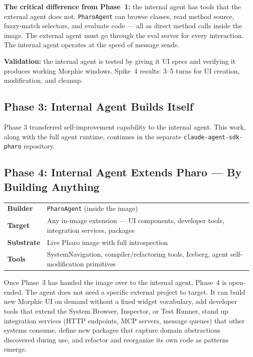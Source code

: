 \documentclass[a4paper,10pt,fleqn]{article}
\newcommand{\cls}[1]{\texttt{#1}}
\begin{document}
\textbf{The critical difference from Phase~1:} the internal agent has
tools that the external agent does not.  \cls{PharoAgent} can browse
classes, read method source, fuzzy-match selectors, and evaluate code
--- all as direct method calls inside the image.  The external agent
must go through the eval server for every interaction.  The internal
agent operates at the speed of message sends.

\textbf{Validation:} the internal agent is tested by giving it UI
specs and verifying it produces working Morphic windows.  Spike~4
results: 3--5 turns for UI creation, modification, and cleanup.

\subsection{Phase 3: Internal Agent Builds Itself}

Phase 3 transferred self-improvement capability to the internal agent.
This work, along with the full agent runtime, continues in the separate
\texttt{claude-agent-sdk-pharo} repository.

\subsection{Phase 4: Internal Agent Extends Pharo --- By Building Anything}

\begin{center}
\begin{tabularx}{\linewidth}{@{}lY@{}}
\toprule
\textbf{Builder} & \cls{PharoAgent} (inside the image) \\
\textbf{Target} & Any in-image extension --- UI components, developer
  tools, integration services, packages \\
\textbf{Substrate} & Live Pharo image with full introspection \\
\textbf{Tools} & SystemNavigation, compiler/refactoring tools, Iceberg,
  agent self-modification primitives \\
\bottomrule
\end{tabularx}
\end{center}

Once Phase~3 has handed the image over to the internal agent, Phase~4
is open-ended.  The agent does not need a specific external project to
target.  It can build new Morphic UI on demand without a fixed widget
vocabulary, add developer tools that extend the System Browser,
Inspector, or Test Runner, stand up integration services (HTTP
endpoints, MCP servers, message queues) that other systems consume,
define new packages that capture domain abstractions discovered during
use, and refactor and reorganize its own code as patterns emerge.
\end{document}
